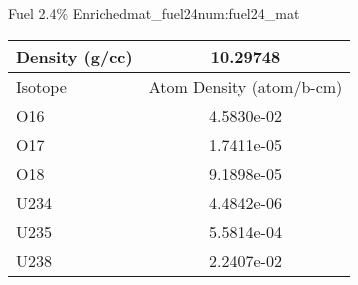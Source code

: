\begin{matitem}{Fuel 2.4\% Enriched}{mat_fuel24}{num:fuel24_mat}
  \centering
  \begin{tabular}{l c}
    \toprule
    Density (g/cc) & 10.29748 \\
    \midrule
    Isotope & Atom Density (atom/b-cm) \\
    \midrule
    \midrule
O16 & 4.5830e-02 \\
O17 & 1.7411e-05 \\
O18 & 9.1898e-05 \\
U234 & 4.4842e-06 \\
U235 & 5.5814e-04 \\
U238 & 2.2407e-02 \\

    \bottomrule
  \end{tabular}
\end{matitem}
